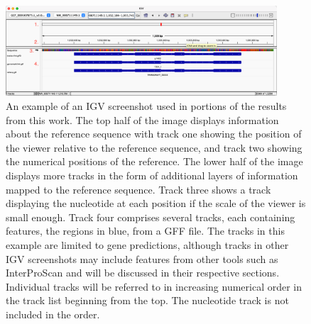\begin{figure}
  \centering
  \includegraphics[width=0.9\textwidth]{figures/igv/igv-agreement-thin-number}
  \caption[IGV example]{An example of an IGV screenshot used in
    portions of the results from this work. The top half of the image
    displays information about the reference sequence with track one
    showing the position of the viewer relative to the reference
    sequence, and track two showing the numerical positions of the
    reference. The lower half of the image displays more tracks in the
    form of additional layers of information mapped to the reference
    sequence. Track three shows a track displaying the nucleotide at
    each position if the scale of the viewer is small enough. Track
    four comprises several tracks, each containing features, the
    regions in blue, from a GFF file. The tracks in this example are
    limited to gene predictions, although tracks in other IGV
    screenshots may include features from other tools such as
    InterProScan and will be discussed in their respective
    sections. Individual tracks will be referred to in increasing
    numerical order in the track list beginning from the top. The
    nucleotide track is not included in the order.}
  \label{fig:igv-methods}
\end{figure}

